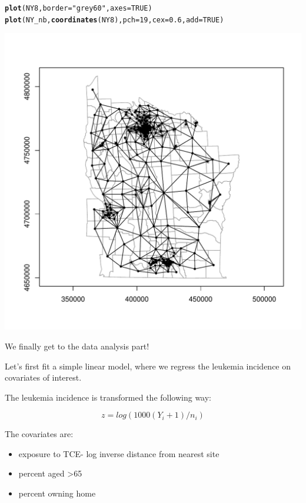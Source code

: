 \documentclass{article}\usepackage[]{graphicx}\usepackage[]{color}
\makeatletter
\def\maxwidth{ %
  \ifdim\Gin@nat@width>\linewidth
    \linewidth
  \else
    \Gin@nat@width
  \fi
}
\newcommand{\hlnum}[1]{\textcolor[rgb]{0.686,0.059,0.569}{#1}}%
\newcommand{\hlstr}[1]{\textcolor[rgb]{0.192,0.494,0.8}{#1}}%
\newcommand{\hlstd}[1]{\textcolor[rgb]{0.345,0.345,0.345}{#1}}%
\newcommand{\hlkwc}[1]{\textcolor[rgb]{0.333,0.667,0.333}{#1}}%
\newcommand{\hlkwd}[1]{\textcolor[rgb]{0.737,0.353,0.396}{\textbf{#1}}}%
\newenvironment{kframe}{%
 \def\at@end@of@kframe{}%
 \ifinner\ifhmode%
  \def\at@end@of@kframe{\end{minipage}}%
  \begin{minipage}{\columnwidth}%
 \fi\fi%
 \def\FrameCommand##1{\hskip\@totalleftmargin \hskip-\fboxsep
 \colorbox{shadecolor}{##1}\hskip-\fboxsep
     \hskip-\linewidth \hskip-\@totalleftmargin \hskip\columnwidth}%
 \MakeFramed {\advance\hsize-\width
   \@totalleftmargin\z@ \linewidth\hsize
   \@setminipage}}%
 {\par\unskip\endMakeFramed%
 \at@end@of@kframe}
\newenvironment{knitrout}{}{} %
\makeatother
\begin{document}
\begin{knitrout}
\color{fgcolor}\begin{kframe}
\begin{alltt}
\hlkwd{plot}\hlstd{(NY8,} \hlkwc{border}\hlstd{=}\hlstr{"grey60"}\hlstd{,} \hlkwc{axes}\hlstd{=}\hlnum{TRUE}\hlstd{)}
\hlkwd{plot}\hlstd{(NY_nb,} \hlkwd{coordinates}\hlstd{(NY8),} \hlkwc{pch}\hlstd{=}\hlnum{19}\hlstd{,} \hlkwc{cex}\hlstd{=}\hlnum{0.6}\hlstd{,} \hlkwc{add}\hlstd{=}\hlnum{TRUE}\hlstd{)}
\end{alltt}
\end{kframe}
\includegraphics[width=\maxwidth]{figure/unnamed-chunk-14} 

\end{knitrout}


We finally get to the data analysis part! 

Let's first fit a simple linear model, where we regress the leukemia incidence on covariates of interest.

The leukemia incidence is transformed the following way:

$$ z = log(1000(Y_i+1)/n_i) $$

The covariates are:
\begin{itemize}
\item exposure to TCE- log inverse distance from nearest site
\item percent aged >65
\item percent owning home
\end{itemize}
\end{document}
